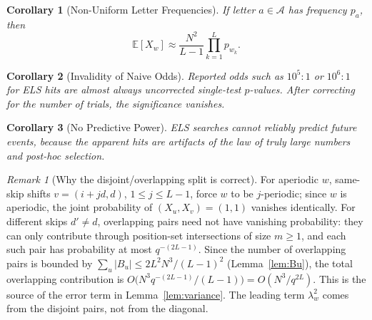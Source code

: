 \documentclass[11pt]{amsart}
\theoremstyle{plain}
\newtheorem{corollary}{Corollary}
\theoremstyle{remark}
\newtheorem{remark}{Remark}
\begin{document}
\begin{corollary}[Non-Uniform Letter Frequencies]
\label{cor:nonuniform}
If letter \(a \in \mathcal{A}\) has frequency \(p_a\), then
\begin{equation}
\label{eq:nonuniform}
\mathbb{E}[X_w] \approx \frac{N^{2}}{L-1}\prod_{k=1}^L p_{w_k}.
\end{equation}
\end{corollary}

\begin{corollary}[Invalidity of Naive Odds]
\label{cor:invalid}
Reported odds such as \(10^5:1\) or \(10^6:1\) for ELS hits are almost
always uncorrected single-test \(p\)-values. After correcting for the
number of trials, the significance vanishes.
\end{corollary}

\begin{corollary}[No Predictive Power]
\label{cor:nopredict}
ELS searches cannot reliably predict future events, because the apparent
hits are artifacts of the law of truly large numbers and post-hoc
selection.
\end{corollary}

\begin{remark}[Why the disjoint/overlapping split is correct]
\label{rem:correct-split}
For aperiodic \(w\), same-skip shifts \(v=(i+jd,d)\), \(1\le j\le L-1\),
force \(w\) to be \(j\)-periodic; since \(w\) is aperiodic, the joint
probability of \((X_u,X_v)=(1,1)\) vanishes identically. For different
skips \(d'\neq d\), overlapping pairs need not have vanishing
probability: they can only contribute through position-set intersections
of size \(m\ge 1\), and each such pair has probability at most
\(q^{-(2L-1)}\). Since the number of overlapping pairs is bounded by
\(\sum_u |B_u| \le 2L^{2}N^{3}/(L-1)^{2}\) (Lemma~\ref{lem:Bu}), the total
overlapping contribution is
\(O\!\bigl(N^{3}q^{-(2L-1)}/(L-1)\bigr) = O(N^{3}/q^{2L})\). This is the
source of the error term in Lemma~\ref{lem:variance}. The leading term
\(\lambda_w^{2}\) comes from the disjoint pairs, not from the diagonal.
\end{remark}
\end{document}
